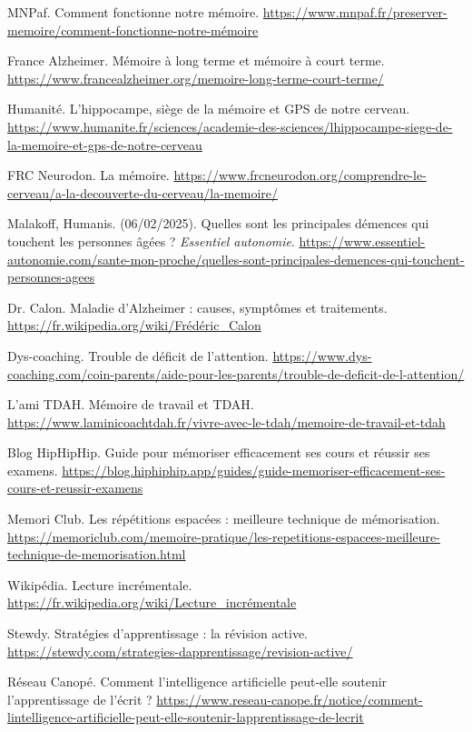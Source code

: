 \documentclass[12pt,a4paper]{report}
\begin{document}
\begin{thebibliography}{9}

        MNPaf. Comment fonctionne notre mémoire. \break
        \url{https://www.mnpaf.fr/preserver-memoire/comment-fonctionne-notre-mémoire}

        France Alzheimer. Mémoire à long terme et mémoire à court terme. \break
        \url{https://www.francealzheimer.org/memoire-long-terme-court-terme/}
        
        Humanité. L'hippocampe, siège de la mémoire et GPS de notre cerveau. \break
        \url{https://www.humanite.fr/sciences/academie-des-sciences/lhippocampe-siege-de-la-memoire-et-gps-de-notre-cerveau}
        
        FRC Neurodon. La mémoire. \break
        \url{https://www.frcneurodon.org/comprendre-le-cerveau/a-la-decouverte-du-cerveau/la-memoire/}

        Malakoff, Humanis. (06/02/2025). Quelles sont les principales démences qui touchent les personnes âgées ? \textit{Essentiel autonomie}. \break
        \url{https://www.essentiel-autonomie.com/sante-mon-proche/quelles-sont-principales-demences-qui-touchent-personnes-agees}

        Dr. Calon. Maladie d'Alzheimer : causes, symptômes et traitements. \break
        \url{https://fr.wikipedia.org/wiki/Frédéric_Calon}
    
        Dys-coaching. Trouble de déficit de l'attention. \break
        \url{https://www.dys-coaching.com/coin-parents/aide-pour-les-parents/trouble-de-deficit-de-l-attention/}

        L'ami TDAH. Mémoire de travail et TDAH. \break
    \url{https://www.laminicoachtdah.fr/vivre-avec-le-tdah/memoire-de-travail-et-tdah}

        Blog HipHipHip. Guide pour mémoriser efficacement ses cours et réussir ses examens. \break
    \url{https://blog.hiphiphip.app/guides/guide-memoriser-efficacement-ses-cours-et-reussir-examens}

        Memori Club. Les répétitions espacées : meilleure technique de mémorisation. \break
    \url{https://memoriclub.com/memoire-pratique/les-repetitions-espacees-meilleure-technique-de-memorisation.html}

        Wikipédia. Lecture incrémentale. \break
    \url{https://fr.wikipedia.org/wiki/Lecture_incrémentale}

        Stewdy. Stratégies d'apprentissage : la révision active. \break
    \url{https://stewdy.com/strategies-dapprentissage/revision-active/}

        Réseau Canopé. Comment l'intelligence artificielle peut-elle soutenir l'apprentissage de l'écrit ? \break
    \url{https://www.reseau-canope.fr/notice/comment-lintelligence-artificielle-peut-elle-soutenir-lapprentissage-de-lecrit}
    
\end{thebibliography}
\end{document}
